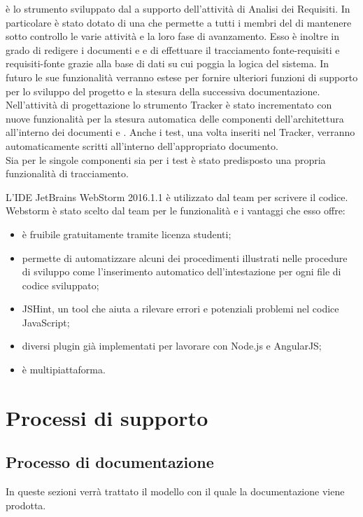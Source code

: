 \documentclass[a4paper, titlepage]{article}
\begin{document}
 è lo strumento sviluppato dal  a supporto dell'attività di Analisi dei Requisiti. In particolare è stato dotato di una  che permette a tutti i membri del  di mantenere sotto controllo le varie attività e la loro fase di avanzamento. Esso è inoltre in grado di redigere i documenti  e  e di effettuare il tracciamento fonte-requisiti e requisiti-fonte grazie alla base di dati su cui poggia la logica del sistema. In futuro le sue funzionalità verranno estese per fornire ulteriori funzioni
di supporto per lo sviluppo del progetto e la stesura della successiva documentazione.
\\
\newline Nell'attività di progettazione lo strumento Tracker è stato incrementato con nuove funzionalità per la stesura automatica delle componenti dell'architettura  all'interno dei documenti  e . 
Anche i test, una volta inseriti nel Tracker, verranno automaticamente scritti all'interno dell'appropriato documento.
\\ Sia per le singole componenti sia per i test è stato predisposto una propria funzionalità di tracciamento.

L'IDE JetBrains WebStorm 2016.1.1 è utilizzato dal team per scrivere il codice.
Webstorm è stato scelto dal team per le funzionalità e i vantaggi che esso offre:
\begin{itemize}
	\item è fruibile gratuitamente tramite licenza studenti;
	\item permette di automatizzare alcuni dei procedimenti illustrati nelle procedure di sviluppo come l'inserimento automatico dell'intestazione per ogni file di codice sviluppato;
	\item JSHint, un tool che aiuta a rilevare errori e potenziali problemi nel codice JavaScript;
	\item diversi plugin già implementati per lavorare con Node.js e AngularJS;
	\item è multipiattaforma.
\end{itemize}

\newpage
\section{Processi di supporto}

\subsection{Processo di documentazione}
In queste sezioni verrà trattato il modello con il quale la documentazione viene prodotta.
\end{document}
